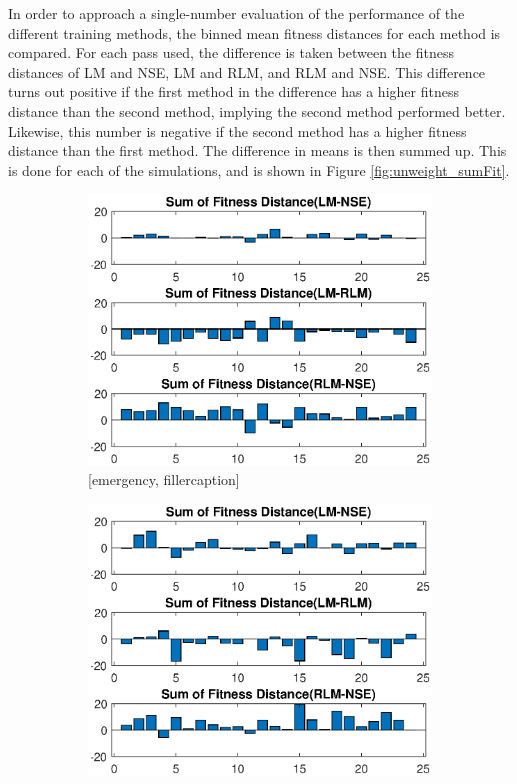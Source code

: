 \par In order to approach a single-number evaluation of the performance of the different training methods, the binned mean fitness distances for each method is compared. For each pass used, the difference is taken between the fitness distances of  LM and NSE, LM and RLM, and RLM and NSE. This difference turns out positive if the first method in the difference has a higher fitness distance than the second method, implying the second method performed better. Likewise, this number is negative if the second method has a higher fitness distance than the first method. The difference in means is then summed up. This is done for each of the simulations, and is shown in Figure \ref{fig:unweight_sumFit}.
\begin{figure}[ht]

\begin{subfigure}{0.55\linewidth}
	\centering
	\includegraphics[scale=0.6]{figures/c_sim_results/emer_unweighted_sumFitness.eps}
	\caption{[emergency, fillercaption]}
	\label{fig:cSimUnweightEmer}
\end{subfigure}%
\begin{subfigure}{0.55\linewidth}
	\centering
	\includegraphics[scale=0.6]{figures/c_sim_results/coop_unweighted_sumFitness.eps}

\end{subfigure}
\end{figure}
